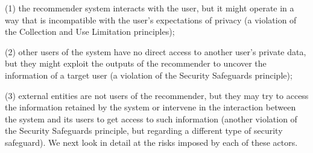 (1) the recommender system interacts with the user, but it might operate in a way that is incompatible with the user's expectations of privacy (a violation of the Collection and Use Limitation principles);

(2) other users of the system have no direct access to another user's private data, but they might exploit the outputs of the recommender to uncover the information of a target user (a violation of the Security Safeguards principle);

(3) external entities are not users of the recommender, but they may try to access the information retained by the system or intervene in the interaction between the system and its users to get access to such information (another violation of the Security Safeguards principle, but regarding a different type of security safeguard). We next look in detail at the risks imposed by each of these actors.
